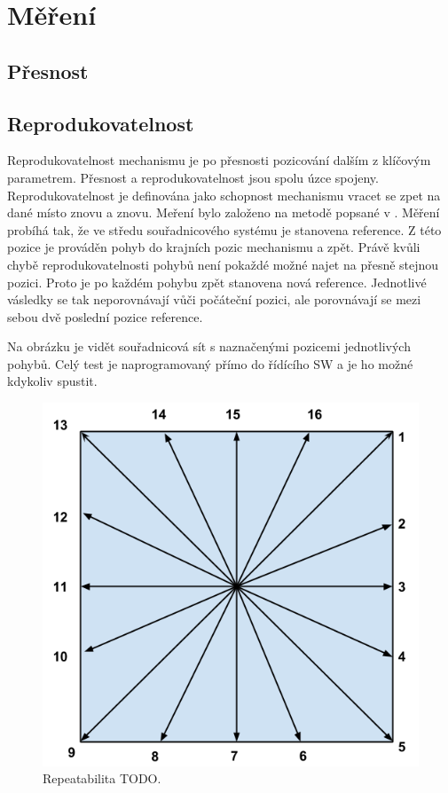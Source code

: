 \chapter{Měření}

\section{Přesnost}
\section{Reprodukovatelnost}
Reprodukovatelnost mechanismu je po přesnosti pozicování dalším z klíčovým parametrem. Přesnost a reprodukovatelnost jsou spolu úzce spojeny. Reprodukovatelnost je definována jako schopnost mechanismu vracet se zpet na dané místo znovu a znovu. 
Meření bylo založeno na metodě popsané v \cite{vaske}. Měření probíhá tak, že ve středu souřadnicového systému je stanovena reference. Z této pozice je prováděn pohyb do krajních pozic mechanismu a zpět. Právě kvůli chybě reprodukovatelnosti pohybů není pokaždé možné najet na přesně stejnou pozici. Proto je po každém pohybu zpět stanovena nová reference. Jednotlivé vásledky se tak neporovnávají vůči počáteční pozici, ale porovnávají se mezi sebou dvě poslední pozice reference.  

Na obrázku \cite{fig:repeatability} je vidět souřadnicová sít s naznačenými pozicemi jednotlivých pohybů. Celý test je naprogramovaný přímo do řídícího SW a je ho možné kdykoliv spustit.

\begin{figure}[h!]
  \centering
    \includegraphics[width=0.9\linewidth]{obrazky/repeatability.png}%
    \caption{Repeatabilita TODO.}
    \label{fig:repeatability}
\end{figure}


